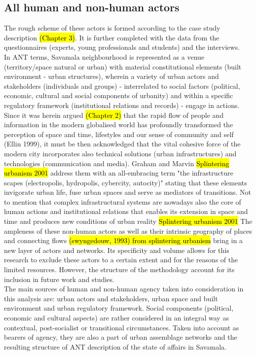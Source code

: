 \documentclass[11pt]{report}
\begin{document}
\subsection{All human and non-human actors}

The rough scheme of these actors is formed according to the case study description \hl{(Chapter 3)}. It is further completed with the data from the questionnaires (experts, young professionals and students) and the interviews.
\\
In ANT terms, Savamala neighbourhood is represented as a venue (territory/space natural or urban) with material constitutional elements (built environment - urban structures), wherein a variety of urban actors and stakeholders (individuals and groups) - interrelated to social factors (political, economic, cultural and social components of urbanity) and within a specific regulatory framework (institutional relations and records) - engage in actions.
Since it was herein argued \hl{(Chapter 2)} that the rapid flow of people and information in the modern globalised world has profoundly transformed the perception of space and time, lifestyles and our sense of community and self (Ellin 1999), it must be then acknowledged that the vital cohesive force of the modern city incorporates also technical solutions (urban infrastructures) and technologies (communication and media).
Graham and Marvin \hl{Splintering urbanism 2001} address them with an  all-embracing term "the infrastructure scapes (electropolis, hydropolis, cybercity, autocity)" stating that these elements invigorate urban life, fuse urban spaces and serve as mediators of transitions. Not to mention that complex infrastructural systems are nowadays also the core of human actions and institutional relations that enables its extension in space and time and produces new conditions of urban reality \hl{Splintering urbanism 2001}
The ampleness of these non-human actors as well as their intrinsic 
geography of places and connecting flows \hl{(swyngedouw, 1993) from splintering urbanism} bring in a new layer of actors and networks. Its specificity and volume allows for this research to exclude these actors to a certain extent and for the reasons of the limited resources. 
However, the structure of the methodology account for its inclusion in future work and studies. 
\\
The main sources of human and non-human agency taken into consideration in this analysis are: urban actors and stakeholders, urban space and built environment and urban regulatory framework. Social components (political, economic and cultural aspects) are rather considered in an integral way as contextual, post-socialist or transitional circumstances. Taken into account as bearers of agency, they are also a part of urban assemblage networks and the resulting structure of ANT description of the state of affairs in Savamala.
\end{document}
